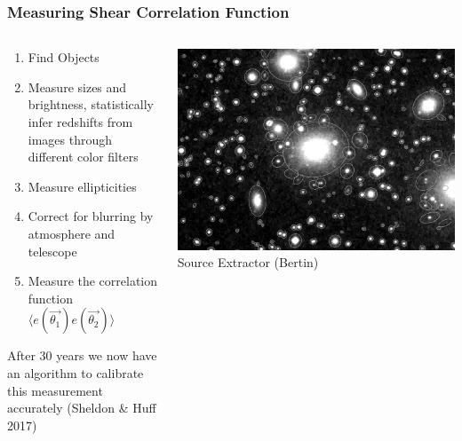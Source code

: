 \documentclass{beamer}
\begin{document}
{\begin{columns}
    \end{columns}


}

\frame
{

    \frametitle{Measuring Shear Correlation Function}


    \begin{columns}
        \begin{column}{0.5\textwidth}
            \begin{enumerate}

                \item Find Objects

                \item Measure sizes and brightness, statistically infer redshifts from
                    images through different color filters
                    
                \item Measure ellipticities

                \item Correct for blurring by atmosphere and telescope

                \item Measure the correlation function
                    {\color{gold} $\langle e(\vec{\theta_1}) e(\vec{\theta_2}) \rangle$ }



            \end{enumerate}

            After 30 years we now have an algorithm to calibrate
                this measurement accurately (Sheldon \& Huff 2017)

        \end{column}
        \begin{column}{0.5\textwidth}

            \begin{center}
                \includegraphics[width=\textwidth]{sun226_fig.png}
                \newline
                {\tiny Source Extractor (Bertin)}
            \end{center}


\end{column}
\end{columns}}
\end{document}
